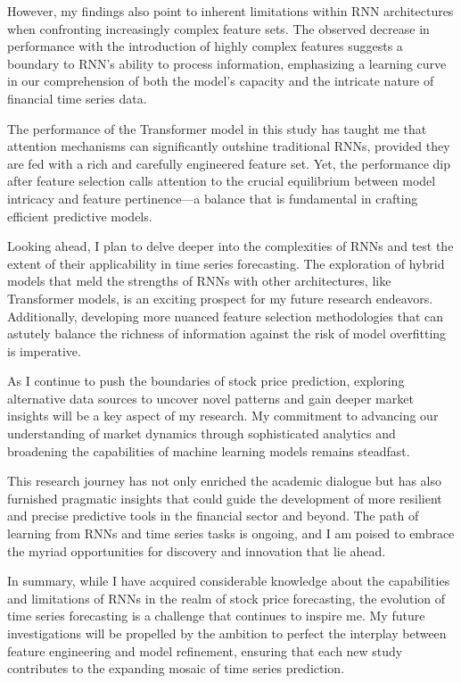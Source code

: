 \documentclass[10pt,twocolumn,letterpaper]{article}
\begin{document}
However, my findings also point to inherent limitations within RNN architectures when confronting increasingly complex feature sets. The observed decrease in performance with the introduction of highly complex features suggests a boundary to RNN's ability to process information, emphasizing a learning curve in our comprehension of both the model's capacity and the intricate nature of financial time series data.

The performance of the Transformer model in this study has taught me that attention mechanisms can significantly outshine traditional RNNs, provided they are fed with a rich and carefully engineered feature set. Yet, the performance dip after feature selection calls attention to the crucial equilibrium between model intricacy and feature pertinence—a balance that is fundamental in crafting efficient predictive models.

Looking ahead, I plan to delve deeper into the complexities of RNNs and test the extent of their applicability in time series forecasting. The exploration of hybrid models that meld the strengths of RNNs with other architectures, like Transformer models, is an exciting prospect for my future research endeavors. Additionally, developing more nuanced feature selection methodologies that can astutely balance the richness of information against the risk of model overfitting is imperative.

As I continue to push the boundaries of stock price prediction, exploring alternative data sources to uncover novel patterns and gain deeper market insights will be a key aspect of my research. My commitment to advancing our understanding of market dynamics through sophisticated analytics and broadening the capabilities of machine learning models remains steadfast.

This research journey has not only enriched the academic dialogue but has also furnished pragmatic insights that could guide the development of more resilient and precise predictive tools in the financial sector and beyond. The path of learning from RNNs and time series tasks is ongoing, and I am poised to embrace the myriad opportunities for discovery and innovation that lie ahead.

In summary, while I have acquired considerable knowledge about the capabilities and limitations of RNNs in the realm of stock price forecasting, the evolution of time series forecasting is a challenge that continues to inspire me. My future investigations will be propelled by the ambition to perfect the interplay between feature engineering and model refinement, ensuring that each new study contributes to the expanding mosaic of time series prediction.

	{\small
		
		
	}
\end{document}
